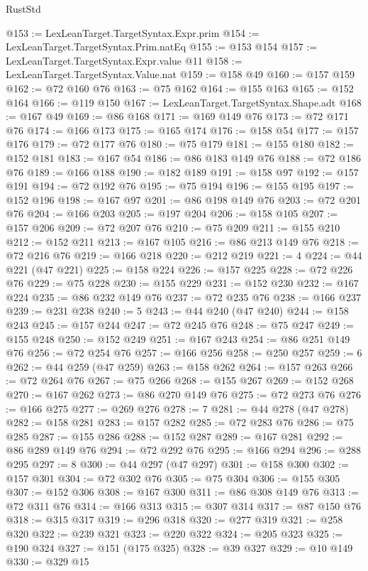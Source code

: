 \begin{lexlean}{RustStd}
\begin{coremodule}
@153 := LexLeanTarget.TargetSyntax.Expr.prim
@154 := LexLeanTarget.TargetSyntax.Prim.natEq
@155 := @153 @154
@157 := LexLeanTarget.TargetSyntax.Expr.value @11
@158 := LexLeanTarget.TargetSyntax.Value.nat
@159 := @158 @49
@160 := @157 @159
@162 := @72 @160 @76
@163 := @75 @162
@164 := @155 @163
@165 := @152 @164
@166 := @119 @150
@167 := LexLeanTarget.TargetSyntax.Shape.adt
@168 := @167 @49
@169 := @86 @168
@171 := @169 @149 @76
@173 := @72 @171 @76
@174 := @166 @173
@175 := @165 @174
@176 := @158 @54
@177 := @157 @176
@179 := @72 @177 @76
@180 := @75 @179
@181 := @155 @180
@182 := @152 @181
@183 := @167 @54
@186 := @86 @183 @149 @76
@188 := @72 @186 @76
@189 := @166 @188
@190 := @182 @189
@191 := @158 @97
@192 := @157 @191
@194 := @72 @192 @76
@195 := @75 @194
@196 := @155 @195
@197 := @152 @196
@198 := @167 @97
@201 := @86 @198 @149 @76
@203 := @72 @201 @76
@204 := @166 @203
@205 := @197 @204
@206 := @158 @105
@207 := @157 @206
@209 := @72 @207 @76
@210 := @75 @209
@211 := @155 @210
@212 := @152 @211
@213 := @167 @105
@216 := @86 @213 @149 @76
@218 := @72 @216 @76
@219 := @166 @218
@220 := @212 @219
@221 := 4
@224 := @44 @221 (@47 @221)
@225 := @158 @224
@226 := @157 @225
@228 := @72 @226 @76
@229 := @75 @228
@230 := @155 @229
@231 := @152 @230
@232 := @167 @224
@235 := @86 @232 @149 @76
@237 := @72 @235 @76
@238 := @166 @237
@239 := @231 @238
@240 := 5
@243 := @44 @240 (@47 @240)
@244 := @158 @243
@245 := @157 @244
@247 := @72 @245 @76
@248 := @75 @247
@249 := @155 @248
@250 := @152 @249
@251 := @167 @243
@254 := @86 @251 @149 @76
@256 := @72 @254 @76
@257 := @166 @256
@258 := @250 @257
@259 := 6
@262 := @44 @259 (@47 @259)
@263 := @158 @262
@264 := @157 @263
@266 := @72 @264 @76
@267 := @75 @266
@268 := @155 @267
@269 := @152 @268
@270 := @167 @262
@273 := @86 @270 @149 @76
@275 := @72 @273 @76
@276 := @166 @275
@277 := @269 @276
@278 := 7
@281 := @44 @278 (@47 @278)
@282 := @158 @281
@283 := @157 @282
@285 := @72 @283 @76
@286 := @75 @285
@287 := @155 @286
@288 := @152 @287
@289 := @167 @281
@292 := @86 @289 @149 @76
@294 := @72 @292 @76
@295 := @166 @294
@296 := @288 @295
@297 := 8
@300 := @44 @297 (@47 @297)
@301 := @158 @300
@302 := @157 @301
@304 := @72 @302 @76
@305 := @75 @304
@306 := @155 @305
@307 := @152 @306
@308 := @167 @300
@311 := @86 @308 @149 @76
@313 := @72 @311 @76
@314 := @166 @313
@315 := @307 @314
@317 := @87 @150 @76
@318 := @315 @317
@319 := @296 @318
@320 := @277 @319
@321 := @258 @320
@322 := @239 @321
@323 := @220 @322
@324 := @205 @323
@325 := @190 @324
@327 := @151 (@175 @325)
@328 := @39 @327
@329 := @10 @149
@330 := @329 @15

\end{coremodule}
\end{lexlean}
